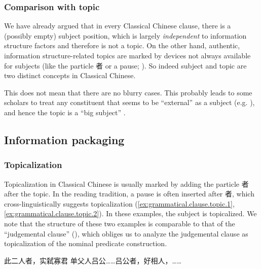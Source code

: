 \documentclass[UTF8, a4paper, oneside, scheme=plain, 12pt]{ctexrep}
\newcommand*{\citepage}[1]{p.~{#1}}
\begin{document}
\subsubsection{Comparison with topic}\label{sec:grammatical.verbal.subject.topic-comparison}

We have already argued that in every Classical Chinese clause,
there is a (possibly empty) subject position,
which is largely \emph{independent} to information structure factors
and therefore is not a topic.
On the other hand, authentic, information structure-related topics
are marked by devices not always available for subjects
(like the particle 者 or a pause; ).
So indeed subject and topic are two distinct concepts in Classical Chinese.

This does not mean that there are no blurry cases. 
This probably leads to some scholars to treat any constituent that seems to be ``external'' as a subject
(e.g. \citealt[\citepage{41}]{li2004grammar}),
and hence the topic is a ``big subject''
\citep[\citepage{42}]{li2004grammar}.

\subsection{Information packaging}\label{sec:grammatical.clause.information}

\subsubsection{Topicalization}\label{sec:grammatical.clause.topic}

Topicalization in Classical Chinese is usually marked by adding the particle 者 after the topic.
In the reading tradition, a pause is often inserted after 者,
which cross-linguistically suggests topicalization
(\ref{ex:grammatical.clause.topic.1}, \ref{ex:grammatical.clause.topic.2}).
In these examples, the subject is topicalized.
We note that the structure of these two examples is comparable to that of the ``judgemental clause''
(),
which obliges us to analyze the judgemental clause as topicalization of the nominal predicate construction.

\begin{exe}
    \ex\label{ex:grammatical.clause.topic.1} 此二人者，实弑寡君
    \ex\label{ex:grammatical.clause.topic.2} 单父人吕公……吕公者，好相人，……
\end{exe}
\end{document}
